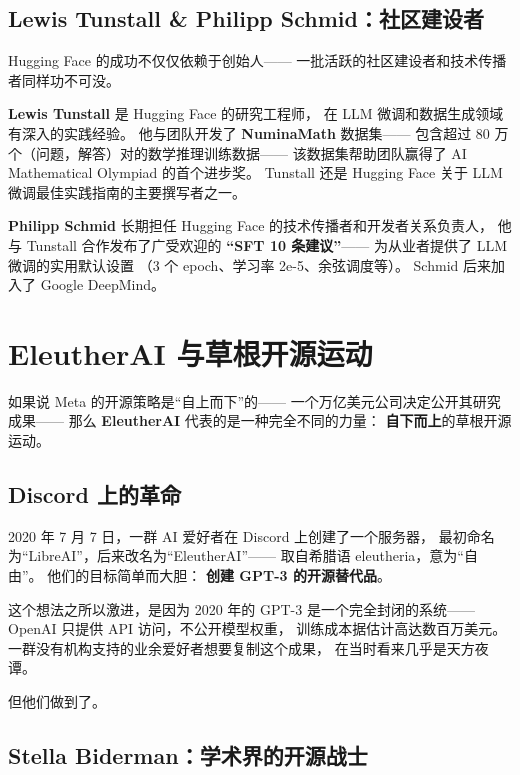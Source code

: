 \subsection{Lewis Tunstall \& Philipp Schmid：社区建设者}

Hugging Face 的成功不仅仅依赖于创始人——
一批活跃的社区建设者和技术传播者同样功不可没。

\textbf{Lewis Tunstall} 是 Hugging Face 的研究工程师，
在 LLM 微调和数据生成领域有深入的实践经验。
他与团队开发了 \textbf{NuminaMath} 数据集——
包含超过 80 万个（问题，解答）对的数学推理训练数据——
该数据集帮助团队赢得了 AI Mathematical Olympiad 的首个进步奖。
Tunstall 还是 Hugging Face 关于 LLM 微调最佳实践指南的主要撰写者之一。

\textbf{Philipp Schmid} 长期担任 Hugging Face 的技术传播者和开发者关系负责人，
他与 Tunstall 合作发布了广受欢迎的
\textbf{``SFT 10 条建议''}——
为从业者提供了 LLM 微调的实用默认设置
（3 个 epoch、学习率 2e-5、余弦调度等）。
Schmid 后来加入了 Google DeepMind。


\section{EleutherAI 与草根开源运动}
\label{sec:eleutherai}

如果说 Meta 的开源策略是``自上而下''的——
一个万亿美元公司决定公开其研究成果——
那么 \textbf{EleutherAI} 代表的是一种完全不同的力量：
\textbf{自下而上}的草根开源运动。

\subsection{Discord 上的革命}

2020 年 7 月 7 日，一群 AI 爱好者在 Discord 上创建了一个服务器，
最初命名为``LibreAI''，后来改名为``EleutherAI''——
取自希腊语 eleutheria，意为``自由''。
他们的目标简单而大胆：
\textbf{创建 GPT-3 的开源替代品}。

这个想法之所以激进，是因为 2020 年的 GPT-3 是一个完全封闭的系统——
OpenAI 只提供 API 访问，不公开模型权重，
训练成本据估计高达数百万美元。
一群没有机构支持的业余爱好者想要复制这个成果，
在当时看来几乎是天方夜谭。

但他们做到了。

\subsection{Stella Biderman：学术界的开源战士}

